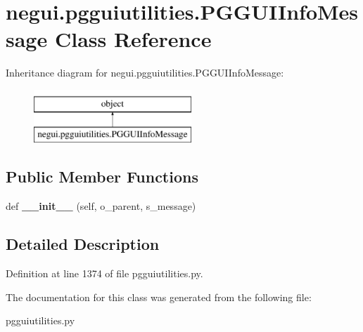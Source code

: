 \hypertarget{classnegui_1_1pgguiutilities_1_1PGGUIInfoMessage}{}\section{negui.\+pgguiutilities.\+P\+G\+G\+U\+I\+Info\+Message Class Reference}
\label{classnegui_1_1pgguiutilities_1_1PGGUIInfoMessage}
Inheritance diagram for negui.\+pgguiutilities.\+P\+G\+G\+U\+I\+Info\+Message\+:\begin{figure}[H]
\begin{center}
\leavevmode
\includegraphics[height=2.000000cm]{classnegui_1_1pgguiutilities_1_1PGGUIInfoMessage}
\end{center}
\end{figure}
\subsection*{Public Member Functions}
\begin{DoxyCompactItemize}
\item 
def {\bfseries \+\_\+\+\_\+init\+\_\+\+\_\+} (self, o\+\_\+parent, s\+\_\+message)\hypertarget{classnegui_1_1pgguiutilities_1_1PGGUIInfoMessage_a6610dd669862924d49f1ec400b4df128}{}\label{classnegui_1_1pgguiutilities_1_1PGGUIInfoMessage_a6610dd669862924d49f1ec400b4df128}

\end{DoxyCompactItemize}


\subsection{Detailed Description}


Definition at line 1374 of file pgguiutilities.\+py.



The documentation for this class was generated from the following file\+:\begin{DoxyCompactItemize}
\item 
pgguiutilities.\+py\end{DoxyCompactItemize}
